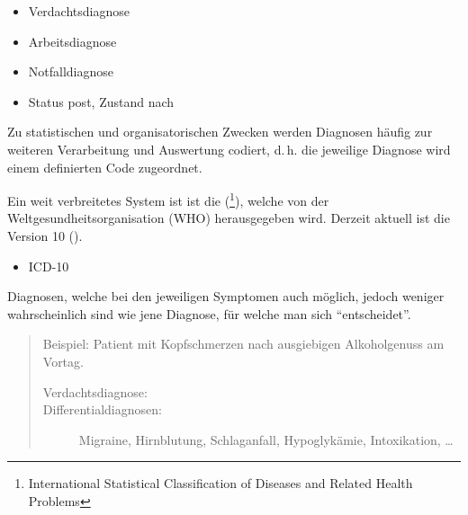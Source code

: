 {
\begin{itemize}
    \item {Verdachtsdiagnose}
    \item {Arbeitsdiagnose}
    \item {Notfalldiagnose}
    \item {Status post}, {Zustand nach}
\end{itemize}}
{}
{}
{}




{Zu statistischen und organisatorischen Zwecken werden
Diagnosen häufig zur weiteren Verarbeitung und Auswertung
codiert, d.\,h. die jeweilige Diagnose wird einem
definierten Code zugeordnet. 

Ein weit verbreitetes System
ist ist die 
(\footnote{ International Statistical
Classification of Diseases and Related Health Problems}),
welche von der Weltgesundheitsorganisation (WHO)
herausgegeben wird. Derzeit aktuell ist die Version 10
({}). 

}
{\begin{itemize}
  \item ICD-10
\end{itemize}}
{}
{}
{}

{%
Diagnosen, welche bei den jeweiligen Symptomen auch
möglich, jedoch weniger wahrscheinlich sind wie jene
Diagnose, für welche man sich \enquote{entscheidet}.

\begin{quote}
Beispiel: Patient mit Kopfschmerzen nach ausgiebigen
Alkoholgenuss am Vortag.
\begin{description}
    \item[Verdachtsdiagnose:] 
    \item[Differentialdiagnosen:]
    Migraine, Hirnblutung, Schlaganfall,
    Hypoglykämie, Intoxikation, \ldots
\end{description}
\end{quote}}
{}
{}
{}
{}






